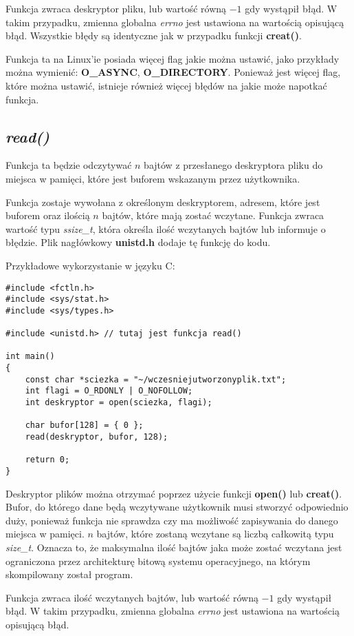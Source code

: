 \documentclass{article}
\begin{document}
Funkcja zwraca deskryptor pliku, lub wartość równą $-1$ gdy wystąpił błąd.
W takim przypadku, zmienna globalna \textit{errno} jest ustawiona na wartością opisującą błąd.
Wszystkie błędy są identyczne jak w przypadku funkcji \textbf{creat()}.

Funkcja ta na Linux'ie posiada więcej flag jakie można ustawić, jako przykłady można wymienić: \textbf{O\_ASYNC}, \textbf{O\_DIRECTORY}.
Ponieważ jest więcej flag, które można ustawić, istnieje również więcej błędów na jakie może napotkać funkcja. 

\subsection{\textit{read()}}
Funkcja ta będzie odczytywać $n$ bajtów z przesłanego deskryptora pliku do miejsca w pamięci,
które jest buforem wskazanym przez użytkownika.

Funkcja zostaje wywołana z określonym deskryptorem, adresem, które jest buforem oraz ilością $n$ bajtów, które mają zostać wczytane. Funkcja zwraca wartość typu \textit{ssize\_t}, która określa ilość wczytanych bajtów lub informuje o błędzie.
Plik nagłówkowy \textbf{unistd.h} dodaje tę funkcję do kodu.

Przykładowe wykorzystanie w języku C:
\begin{verbatim}
#include <fctln.h>
#include <sys/stat.h>
#include <sys/types.h>

#include <unistd.h> // tutaj jest funkcja read()

int main()
{
	const char *sciezka = "~/wczesniejutworzonyplik.txt";
	int flagi = O_RDONLY | O_NOFOLLOW;
	int deskryptor = open(sciezka, flagi);

	char bufor[128] = { 0 };
	read(deskryptor, bufor, 128);

	return 0;
}
\end{verbatim}

Deskryptor plików można otrzymać poprzez użycie funkcji \textbf{open()} lub \textbf{creat()}.
Bufor, do którego dane będą wczytywane użytkownik musi stworzyć odpowiednio duży, ponieważ funkcja nie sprawdza czy ma możliwość zapisywania do danego miejsca w pamięci.
$n$ bajtów, które zostaną wczytane są liczbą całkowitą typu \textit{size\_t}.
Oznacza to, że maksymalna ilość bajtów jaka może zostać wczytana jest ograniczona przez architekturę bitową systemu operacyjnego, na którym skompilowany został program.

Funkcja zwraca ilość wczytanych bajtów, lub wartość równą $-1$ gdy wystąpił błąd.
W takim przypadku, zmienna globalna \textit{errno} jest ustawiona na wartością opisującą błąd.
\end{document}
